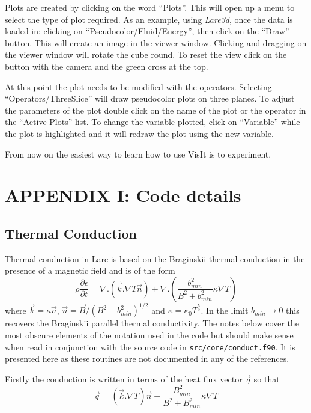 \documentclass[11pt]{article}
\begin{document}
Plots are created by clicking on the word ``Plots''. This will open up a menu to select the type of plot required. As an example, using {\it Lare3d}, once the data is loaded in: clicking on ``Pseudocolor/Fluid/Energy'', then click on the ``Draw'' button. This will create an image in the viewer window. Clicking and dragging on the viewer window will rotate the cube round. To reset the view click on the button  with the camera and the green cross at the top.

At this point the plot needs to be modified with the operators. Selecting ``Operators/ThreeSlice'' will draw pseudocolor plots on three planes. To adjust the parameters of the plot double click on the name of the plot or the operator in the ``Active Plots'' list. To change the variable plotted, click on ``Variable'' while the plot is highlighted and it will redraw the plot using the new variable.

From now on the easiest way to learn how to use VisIt is to experiment.

\newpage
\section*{ APPENDIX I: Code details}
\subsection*{Thermal Conduction} %
\label{sec:thermal_code}

Thermal conduction in Lare is based on the Braginskii thermal conduction in the presence of a magnetic field and is of the form\\
\[
\rho \frac{\partial \epsilon}{\partial t} = \nabla . \left(\vec{k} . \nabla T \vec{n} \right) +  \nabla . \left(  \frac{b_{min}^2}{B^2+b_{min}^2} \kappa \nabla T \right)
\]
where $\vec{k} = \kappa \vec{n}$, $\vec{n} = \vec{B}/(B^2+b_{min}^2)^{1/2}$ and $\kappa = \kappa_0  T^\frac{5}{2}$. In the limit $b_{min}\to 0$ this recovers the Braginskii parallel thermal conductivity. The notes below cover the most obscure elements of the notation used in the code but should make sense when read in conjunction with the source code in {\tt src/core/conduct.f90}. It is presented here as these routines are not documented in any of the references.

Firstly the conduction is written in terms of the heat flux vector $\vec{q}$ so that
\[
\vec{q}= \left(\vec{k} . \nabla T \right) \vec{n} +    \frac{B_{min}^2}{B^2+B_{min}^2} \kappa \nabla T
\]
\end{document}
